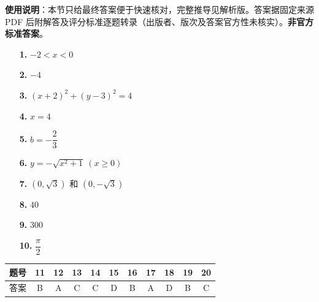 
\begin{gknotice}
\textbf{使用说明}：本节只给最终答案便于快速核对，完整推导见解析版。答案据固定来源 PDF 后附解答及评分标准逐题转录（出版者、版次及答案官方性未核实）。\textbf{非官方标准答案}。
\end{gknotice}

\begin{itemize}[leftmargin=2.6em]
  \item[\textbf{1.}] \(-2<x<0\)
  \item[\textbf{2.}] \(-4\)
  \item[\textbf{3.}] \((x+2)^2+(y-3)^2=4\)
  \item[\textbf{4.}] \(x=4\)
  \item[\textbf{5.}] \(b=-\dfrac23\)
  \item[\textbf{6.}] \(y=-\sqrt{x^2+1}\ (x\ge0)\)
  \item[\textbf{7.}] \((0,\sqrt3)\) 和 \((0,-\sqrt3)\)
  \item[\textbf{8.}] \(40\)
  \item[\textbf{9.}] \(300\)
  \item[\textbf{10.}] \(\dfrac\pi2\)
\end{itemize}

\begin{center}\begin{tabular}{ccccccccccc}
\toprule
题号 & 11 & 12 & 13 & 14 & 15 & 16 & 17 & 18 & 19 & 20 \\
\midrule
答案 & B & A & C & C & D & B & A & D & B & C \\
\bottomrule
\end{tabular}\end{center}

